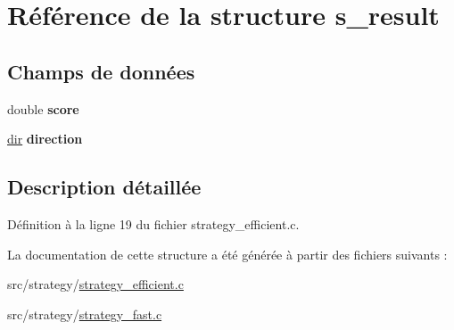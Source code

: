 \hypertarget{structs__result}{
\section{Référence de la structure s\_\-result}
\label{structs__result}
}
\subsection*{Champs de données}
\begin{DoxyCompactItemize}
\item 
\hypertarget{structs__result_a40a24ec85daa9ac70aa74e4ca744f838}{
double {\bfseries score}}
\label{structs__result_a40a24ec85daa9ac70aa74e4ca744f838}

\item 
\hypertarget{structs__result_af38e64cfffd4190801bd8aa25f3f60af}{
\hyperlink{grid_8h_a862c63b15eab5b0d2781cea356e5d935}{dir} {\bfseries direction}}
\label{structs__result_af38e64cfffd4190801bd8aa25f3f60af}

\end{DoxyCompactItemize}


\subsection{Description détaillée}


Définition à la ligne 19 du fichier strategy\_\-efficient.c.



La documentation de cette structure a été générée à partir des fichiers suivants :\begin{DoxyCompactItemize}
\item 
src/strategy/\hyperlink{strategy__efficient_8c}{strategy\_\-efficient.c}\item 
src/strategy/\hyperlink{strategy__fast_8c}{strategy\_\-fast.c}\end{DoxyCompactItemize}
